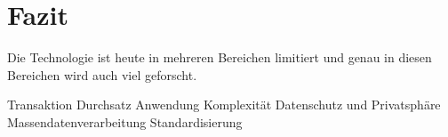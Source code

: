 \section{Fazit}
Die Technologie ist heute in mehreren Bereichen limitiert und genau in diesen Bereichen wird auch viel geforscht.

Transaktion Durchsatz
Anwendung Komplexität
Datenschutz und Privatsphäre
Massendatenverarbeitung
Standardisierung
